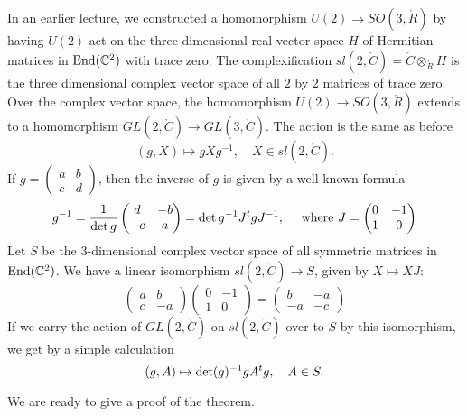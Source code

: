 \documentclass{amsart}
\def\t#1{\hbox{}^t#1}
\def\CC{\ring{C}}
\def\RR{\ring{R}}
\begin{document}
In an earlier lecture, we constructed a homomorphism $U(2)\to
SO(3,\RR)$ by having $U(2)$ act on the three dimensional real
vector space $H$ of Hermitian matrices in $\op{End}(\CC^2)$ with
trace zero.  The complexification
$sl(2,\CC)=\CC\otimes_{\RR} H$ is the three dimensional
complex vector space of all $2$ by $2$
matrices of trace zero.  Over the complex vector space, the
homomorphism $U(2)\to SO(3,\RR)$ extends to a homomorphism
$GL(2,\CC)\to GL(3,\CC)$.  The action is the same as before
\[
(g,X)\mapsto g X g^{-1},\quad X\in sl(2,\CC).
\]
If $g = \begin{pmatrix} a& b\\ c & d\end{pmatrix}$, then the inverse
of $g$ is given by a well-known formula
\[
g^{-1} = \frac{1}{\det{g}}\begin{pmatrix} d & - b \\ -c & a\end{pmatrix} 
= \det g^{-1} J \t{g} J^{-1}, \quad
\hbox{ where } J = \begin{pmatrix} 0 & -1 \\ 1 &0 \end{pmatrix}
\]
Let $S$ be the $3$-dimensional complex vector space of all symmetric matrices in $\op{End}(\CC^2)$.
We have a linear isomorphism $sl(2,\CC)\to S$, given by $X\mapsto X J$:
\[
\begin{pmatrix} a& b\\c & -a\end{pmatrix} \begin{pmatrix} 0& -1 \\1 &0\end{pmatrix} = 
\begin{pmatrix} b & -a \\ -a & -c \end{pmatrix}
\]
If we carry the action of $GL(2,\CC)$ on $sl(2,\CC)$
over to $S$ by this isomorphism, we get by a simple calculation
\[
(g,A) \mapsto \det(g)^{-1} g A \t{g},\quad A \in S.
\]

We are ready to give a proof of the theorem.
\end{document}
